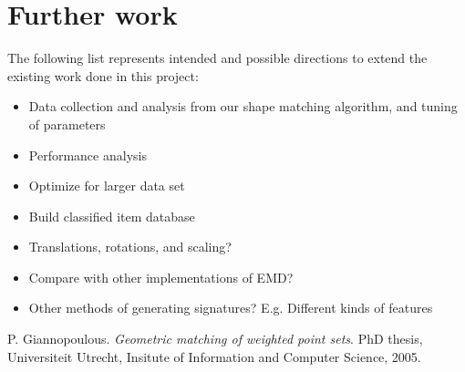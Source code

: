 \documentclass[10pt,a4paper]{article}
\begin{document}
\section{Further work}

The following list represents intended and possible directions to extend the existing work done in this project:

\begin{itemize}
	\item Data collection and analysis from our shape matching algorithm, and tuning of parameters
	\item Performance analysis
	\item Optimize for larger data set
	\item Build classified item database
	\item Translations, rotations, and scaling?
	\item Compare with other implementations of EMD?
	\item Other methods of generating signatures? E.g. Different kinds of features
\end{itemize}

\begin{thebibliography}{9}

  P. Giannopoulous. 
  \emph{Geometric matching of weighted point sets}. 
  PhD thesis, Universiteit Utrecht, Insitute of Information and Computer Science, 2005.

\end{thebibliography}
\end{document}
